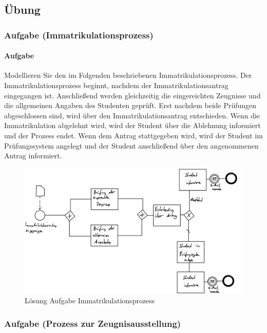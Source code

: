 \subsection{Übung}

\subsubsection*{Aufgabe (Immatrikulationsprozess)}
    \paragraph*{Aufgabe}
        Modellieren Sie den im Folgenden beschriebenen Immatrikulationsprozess.
        Der Immatrikulationsprozess beginnt, nachdem der Immatrikulationsantrag eingegangen ist. Anschließend werden gleichzeitig die eingereichten Zeugnisse und die allgemeinen Angaben des Studenten geprüft. Erst nachdem beide Prüfungen abgeschlossen sind, wird über den Immatrikulationsantrag entschieden. Wenn die Immatrikulation abgelehnt wird, wird der Student über die Ablehnung informiert und der Prozess endet. Wenn dem Antrag stattgegeben wird, wird der Student im Prüfungssystem angelegt und der Student anschließend über den angenommenen Antrag informiert.
        \begin{figure}[h]
            \centering
            \includegraphics[width=\textwidth]{image/Loesung_Aufgabe_Immatrikulationsprozess.png}
            \caption{Lösung Aufgabe Immatrikulationsprozess}
            \label{fig:Loesung_Aufgabe_Immatrikulationsprozess}
        \end{figure}

\subsubsection*{Aufgabe (Prozess zur Zeugnisausstellung)}
